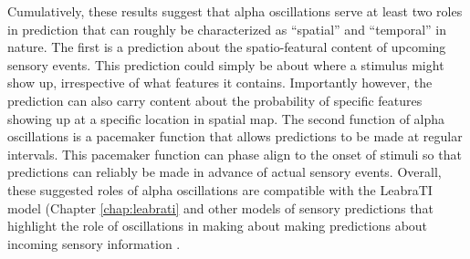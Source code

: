 \documentclass[dwyatte_dissertation.tex]{subfiles}
\begin{document}
Cumulatively, these results suggest that alpha oscillations serve at least two roles in prediction that can roughly be characterized as ``spatial'' and ``temporal'' in nature. The first is a prediction about the spatio-featural content of upcoming sensory events. This prediction could simply be about where a stimulus might show up, irrespective of what features it contains. Importantly however, the prediction can also carry content about the probability of specific features showing up at a specific location in spatial map\cite{KokRahnevJeheeEtAl12,WyartNobreSummerfield12,HorschigJensenVanSchouwenburgEtAl13}. The second function of alpha oscillations is a pacemaker function that allows predictions to be made at regular intervals. This pacemaker function can phase align to the onset of stimuli \cite{SchroederLakatosKajikawaEtAl08,CalderoneLakatosButlerEtAlInPress} so that predictions can reliably be made in advance of actual sensory events. Overall, these suggested roles of alpha oscillations are compatible with the LeabraTI model (Chapter \ref{chap:leabrati} and other models of sensory predictions that highlight the role of oscillations in making about making predictions about incoming sensory information \cite{ArnalGiraud12,GiraudPoeppel12}.



%

%
%
\end{document}
